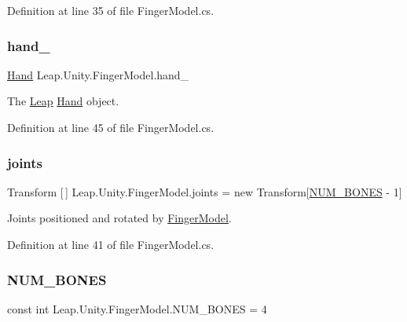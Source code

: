 Definition at line 35 of file Finger\+Model.\+cs.

\mbox{\label{class_leap_1_1_unity_1_1_finger_model_a2157942a6279b6457c632ce5024e8f27}} 
\subsubsection{\texorpdfstring{hand\_}{hand\_}}
{\footnotesize\ttfamily \mbox{\hyperlink{class_leap_1_1_hand}{Hand}} Leap.\+Unity.\+Finger\+Model.\+hand\+\_\+\hspace{0.3cm}{\ttfamily [protected]}}

The \mbox{\hyperlink{namespace_leap_1_1_unity_1_1_leap}{Leap}} \mbox{\hyperlink{class_leap_1_1_hand}{Hand}} object. 

Definition at line 45 of file Finger\+Model.\+cs.

\mbox{\label{class_leap_1_1_unity_1_1_finger_model_ac4bafebe19d4651bf35e95a52288aa24}} 
\subsubsection{\texorpdfstring{joints}{joints}}
{\footnotesize\ttfamily Transform \mbox{[}$\,$\mbox{]} Leap.\+Unity.\+Finger\+Model.\+joints = new Transform\mbox{[}\mbox{\hyperlink{class_leap_1_1_unity_1_1_finger_model_a35043ac951361f61a591a5a69083ab8c}{N\+U\+M\+\_\+\+B\+O\+N\+ES}} -\/ 1\mbox{]}}

Joints positioned and rotated by \mbox{\hyperlink{class_leap_1_1_unity_1_1_finger_model}{Finger\+Model}}. 

Definition at line 41 of file Finger\+Model.\+cs.

\mbox{\label{class_leap_1_1_unity_1_1_finger_model_a35043ac951361f61a591a5a69083ab8c}} 
\subsubsection{\texorpdfstring{NUM\_BONES}{NUM\_BONES}}
{\footnotesize\ttfamily const int Leap.\+Unity.\+Finger\+Model.\+N\+U\+M\+\_\+\+B\+O\+N\+ES = 4}

